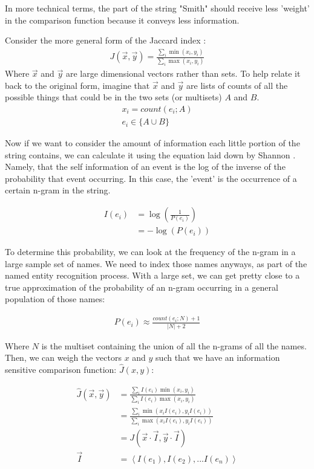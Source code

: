 \documentclass[11pt]{article}
\begin{document}
In more technical terms, the part of the string "Smith"
should receive less 'weight' in the comparison function because
it conveys less information. 

Consider the more general form of the Jaccard index \cite{general}:
\begin{align*}
J(\vec{x},\vec{y}) = 
\frac{\sum_i \min(x_i, y_i)}{\sum_i \max(x_i, y_i)}
\end{align*}
Where $\vec{x}$ and $\vec{y}$ are large dimensional vectors rather 
than sets. To help relate it back to the original form, 
imagine that $\vec{x}$ and $\vec{y}$ are lists
of counts of all the possible things that could be in the two sets
(or multisets) $A$ and $B$.
\begin{align*}
x_i = count(e_i; A)\\
e_i \in \{A \cup B \}
\end{align*}

Now if we want to consider the amount of information each little
portion of the string contains, we can calculate it
using the equation laid down by Shannon \cite{shannon}.
Namely, that the self information of an event is the log of the
inverse of the probability that event occurring. In this case,
the 'event' is the occurrence of a certain n-gram in the string.

\begin{align*}
I(e_i) &= \log\left(\frac{1}{P(e_i)}\right)\\
&= -\log(P(e_i))
\end{align*}

To determine this probability, we can look at the frequency
of the n-gram in a large sample set of names.
We need to index those names anyways, as part of the named entity
recognition process. With a large set, we can get pretty close to a true 
approximation of the probability of an n-gram occurring in 
a general population of those names:

\begin{align*}
P(e_i) \approx \frac{count(e_i; N)+1}{|N|+2}
\end{align*}

Where $N$ is the multiset containing the union of all the n-grams of
all the names. 
Then, we can weigh the vectors $x$ and $y$ such that we have
an information sensitive comparison function: $\hat{J}(x,y)$:

\begin{align*}
\hat{J}(\vec{x},\vec{y}) 
&= \frac{
    \sum_i I(e_i)\min(x_i, y_i)
}{
    \sum_i I(e_i)\max(x_i, y_i)
}\\
&= \frac{
    \sum_i \min(x_iI(e_i), y_iI(e_i))
}{
    \sum_i \max(x_iI(e_i), y_iI(e_i))
}\\
&= J\left(\vec{x} \cdot \vec{I}, \vec{y} \cdot \vec{I} \right)\\
\vec{I} &= \left< I(e_1), I(e_2), ... I(e_n) \right>
\end{align*}
\end{document}
